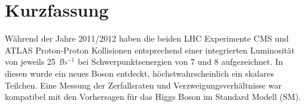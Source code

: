\documentclass[11pt,a4paper]{article}
\begin{document}
\def\gluino{\mbox{$\tilde g$}\xspace}
\def\mgluino{\mbox{$m_{\tilde g}$}\xspace}
\def\mStop{\mbox{$m_{\tilde t}$}\xspace}
\def\mSbottom{\mbox{$m_{\tilde b}$}\xspace}
\def\mCha{\mbox{$m_{\tilde{\chi}^{\pm}_1}$}\xspace}
\def\mNeu{\mbox{$m_{\tilde{\chi}^{0}_1}$}\xspace}
\def\nbtags{\mbox{$n_{\cPqb\textrm{-tag}}$}\xspace}
\def\njets{\mbox{$n_{\textrm{jets}}$}\xspace}
\def\mT{\mbox{$m_{\textrm{T}}$}\xspace}
\newcommand{\jptratio}[2]{\mbox{$p_{\textrm{T\,\vline\,#1,#2}}^{\textrm{ratio}}$}\xspace}
\newcommand{\ptb}[1]{\mbox{$p_{\textrm{T}}^{}(b_#1)$}\xspace}
\def\mTW{\mbox{$m_{\textrm{T}2}^W$}\xspace}
\def\HT{\mbox{$H_{\textrm{T}}$}\xspace}
\def\HTratio{\mbox{$H_{\textrm{T}}^{\textrm{ratio}}$}\xspace}
\def\dphi{\mbox{$\Delta\phi(W,l)$}\xspace}
\def\dphimet{\mbox{$\Delta\phi(\ETmiss,j_{1,2})$}\xspace}
\def\ttjets{\mbox{\ensuremath{\cmsSymbolFace{t}\overline{\cmsSymbolFace{t}}}+jets}\xspace}
\def\wjets{\mbox{\ensuremath{W}+jets}\xspace}
\newcommand{\fixme}[1]{\textcolor{red}{FIXME: #1}} %
\newcommand{\tobechecked}[1]{\textcolor{red}{#1}\marginpar{\textcolor{red}{\textbf{X}}}}
\newcommand{\boldStart}[1]{\noindent{\bf{#1}}}
\onehalfspacing
\addtolength{\leftmargin}{-2in}
\thispagestyle{empty}

\section*{Kurzfassung}

W\"ahrend der Jahre 2011/2012 haben die beiden LHC Experimente CMS und ATLAS Proton-Proton Kollisionen entsprechend einer integrierten Luminosit\"at von jeweils 25~fb$^{-1}$ bei  Schwerpunktsenergien von 7 und 8 \TeV aufgezeichnet.
In diesen wurde ein neues Boson entdeckt, h\"ochstwahrscheinlich ein skalares Teilchen. Eine Messung der Zerfallsraten und Verzweigungsverh\"altnisse  war kompatibel mit den Vorhersagen f\"ur das Higgs Boson im Standard Modell (SM).
\end{document}
